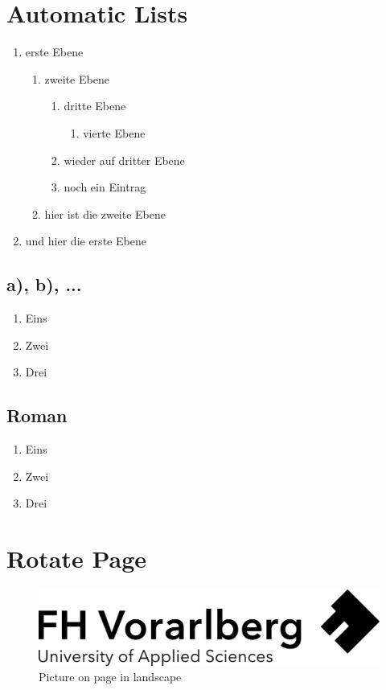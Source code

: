 \section{Automatic Lists}

\begin{enumerate}
\item erste Ebene
\begin{enumerate}
\item zweite Ebene
\begin{enumerate}
\item dritte Ebene
\begin{enumerate}
\item vierte Ebene
\end{enumerate}
\item wieder auf dritter Ebene 
\item noch ein Eintrag 
\end{enumerate}
\item hier ist die zweite Ebene
\end{enumerate}
\item und hier die erste Ebene
\end{enumerate}

\subsection{a), b), ...}

\renewcommand{\labelenumi}{\alph{enumi})}
\begin{enumerate}
\item Eins
\item Zwei
\item Drei
\end{enumerate}

\subsection{Roman}

\renewcommand{\labelenumi}{\roman{enumi}}
\begin{enumerate}
\item Eins
\item Zwei
\item Drei
\end{enumerate}

\section{Rotate Page}
\begin{landscape}
\thispagestyle{empty}
\begin{figure}
    \centering
    \includegraphics[width=1.5\textheight]{_other/titlepage/Logo-A3.jpg}
    \caption{Picture on page in landscape}
    \label{fig:other}
\end{figure}
\end{landscape}